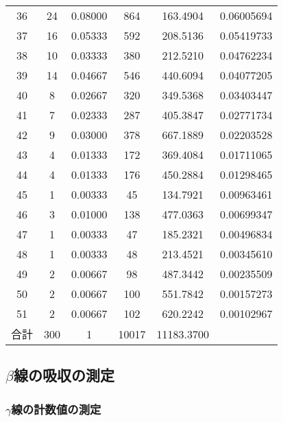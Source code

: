 \documentclass{jarticle}
\begin{document}
\begin{table}[H]
\begin{tabular}{cccccc}
    36 & 24 & 0.08000 & 864 & 163.4904 & 0.06005694 \\
    37 & 16 & 0.05333 & 592 & 208.5136 & 0.05419733 \\
    38 & 10 & 0.03333 & 380 & 212.5210 & 0.04762234 \\
    39 & 14 & 0.04667 & 546 & 440.6094 & 0.04077205 \\
    40 & 8 & 0.02667 & 320 & 349.5368 & 0.03403447 \\
    41 & 7 & 0.02333 & 287 & 405.3847 & 0.02771734 \\
    42 & 9 & 0.03000 & 378 & 667.1889 & 0.02203528 \\
    43 & 4 & 0.01333 & 172 & 369.4084 & 0.01711065 \\
    44 & 4 & 0.01333 & 176 & 450.2884 & 0.01298465 \\
    45 & 1 & 0.00333 & 45 & 134.7921 & 0.00963461 \\
    46 & 3 & 0.01000 & 138 & 477.0363 & 0.00699347 \\
    47 & 1 & 0.00333 & 47 & 185.2321 & 0.00496834 \\
    48 & 1 & 0.00333 & 48 & 213.4521 & 0.00345610 \\
    49 & 2 & 0.00667 & 98 & 487.3442 & 0.00235509 \\
    50 & 2 & 0.00667 & 100 & 551.7842 & 0.00157273 \\
    51 & 2 & 0.00667 & 102 & 620.2242 & 0.00102967 \\
    \hline
    合計 & 300 & 1 & 10017 & 11183.3700 & \\
    \hline
    \end{tabular}
\end{table}



\subsection{$\beta$線の吸収の測定}


\subsubsection{$\gamma$線の計数値の測定}
\end{document}
